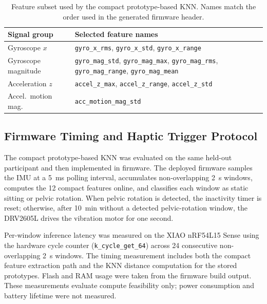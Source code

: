\begin{table}[!htbp]
    \centering
    \footnotesize
    \caption{Feature subset used by the compact prototype-based KNN. Names match the order used in the generated firmware header.}
    \label{tab:ch6_compact_knn_features}
    \begin{tabularx}{\linewidth}{lX}
        \toprule
        Signal group & Selected feature names \\
        \midrule
        Gyroscope $x$        & \texttt{gyro\_x\_rms}, \texttt{gyro\_x\_std}, \texttt{gyro\_x\_range} \\
        Gyroscope magnitude  & \texttt{gyro\_mag\_std}, \texttt{gyro\_mag\_max}, \texttt{gyro\_mag\_rms}, \texttt{gyro\_mag\_range}, \texttt{gyro\_mag\_mean} \\
        Acceleration $z$     & \texttt{accel\_z\_max}, \texttt{accel\_z\_range}, \texttt{accel\_z\_std} \\
        Accel.\ motion mag.  & \texttt{acc\_motion\_mag\_std} \\
        \bottomrule
    \end{tabularx}
\end{table}

\subsection{Firmware Timing and Haptic Trigger Protocol}

The compact prototype-based KNN was evaluated on the same held-out participant and then implemented in firmware. The deployed firmware samples the IMU at a 5~ms polling interval, accumulates non-overlapping 2~s windows, computes the 12 compact features online, and classifies each window as static sitting or pelvic rotation. When pelvic rotation is detected, the inactivity timer is reset; otherwise, after 10~min without a detected pelvic-rotation window, the DRV2605L drives the vibration motor for one second.

Per-window inference latency was measured on the XIAO nRF54L15 Sense using the hardware cycle counter (\texttt{k\_cycle\_get\_64}) across 24 consecutive non-overlapping 2~s windows. The timing measurement includes both the compact feature extraction path and the KNN distance computation for the stored prototypes. Flash and RAM usage were taken from the firmware build output. These measurements evaluate compute feasibility only; power consumption and battery lifetime were not measured.
